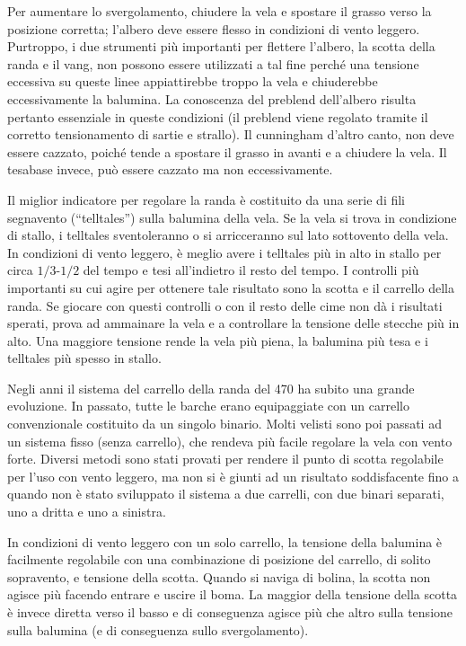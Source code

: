 Per aumentare lo svergolamento, chiudere la vela e spostare il grasso
verso la posizione corretta; l'albero deve essere flesso in condizioni di vento
leggero. Purtroppo, i due strumenti più importanti per flettere l'albero, la
scotta della randa e il vang, non possono essere utilizzati a tal fine perché una tensione
eccessiva su queste linee appiattirebbe troppo la vela e chiuderebbe
eccessivamente la balumina. La conoscenza del preblend dell'albero risulta
pertanto essenziale in queste condizioni (il preblend viene regolato tramite il
corretto tensionamento di sartie e strallo). Il cunningham d'altro canto, non
deve essere cazzato, poiché tende a spostare il grasso in avanti e a chiudere la
vela. Il tesabase invece, può essere cazzato ma non eccessivamente.

Il miglior indicatore per regolare la randa è costituito da una serie di fili
segnavento (``telltales'') sulla
balumina della vela. Se la vela si trova in condizione di stallo, i
telltales sventoleranno o si arricceranno sul lato sottovento della vela. In condizioni di vento leggero, è meglio avere
i telltales più in alto in stallo per circa $1/3$-$1/2$ del tempo e tesi all'indietro
il resto del tempo. I controlli più importanti su cui agire per ottenere tale
risultato sono la scotta e il carrello della randa. Se giocare con questi
controlli o con il resto delle cime non dà i risultati sperati, prova ad ammainare
la vela e a controllare la tensione delle stecche più in alto. Una maggiore tensione
rende la vela più piena, la balumina più tesa e i telltales più spesso in
stallo.

Negli anni il sistema del carrello della randa del 470 ha subito una grande
evoluzione. In passato, tutte le barche erano equipaggiate con un carrello
convenzionale costituito da un singolo binario. Molti velisti sono poi passati ad un sistema
fisso (senza carrello), che rendeva più facile regolare la vela con vento forte.
Diversi metodi sono stati provati per rendere il punto di scotta regolabile per l'uso con vento
leggero, ma non si è giunti ad un risultato soddisfacente fino a quando non è
stato sviluppato il sistema a due carrelli, con due binari separati, uno a
dritta e uno a sinistra.

In condizioni di vento leggero con un solo carrello, la tensione della balumina
è facilmente regolabile con una combinazione di posizione del carrello, di
solito sopravento, e tensione della scotta. Quando si naviga
di bolina, la scotta non agisce più facendo entrare e uscire il boma. La
maggior della tensione della scotta è invece diretta verso il basso e di
conseguenza agisce più che altro sulla tensione sulla balumina (e di conseguenza
sullo svergolamento).


